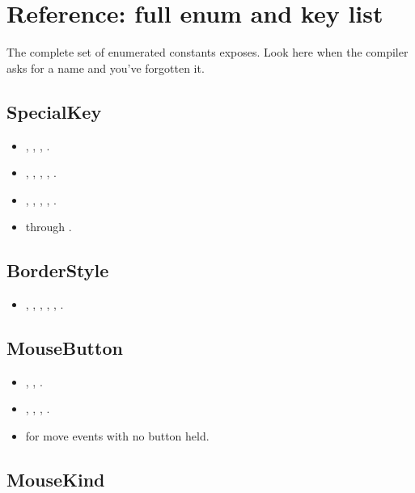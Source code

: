 \chapter{Reference: full enum and key list}
\label{ch:refman-enums}

\begin{aside}
The complete set of enumerated constants \maya{} exposes.
Look here when the compiler asks for a name and you've
forgotten it.
\end{aside}

\section{SpecialKey}

\begin{itemize}[leftmargin=*]
  \item {}, , , .
  \item {}, , ,
    , .
  \item {}, , ,
    , .
  \item {} through .
\end{itemize}

\section{BorderStyle}

\begin{itemize}[leftmargin=*]
  \item {}, , ,
    , , .
\end{itemize}

\section{MouseButton}

\begin{itemize}[leftmargin=*]
  \item {}, , .
  \item {}, ,
    , .
  \item {} for move events with no button held.
\end{itemize}

\section{MouseKind}

